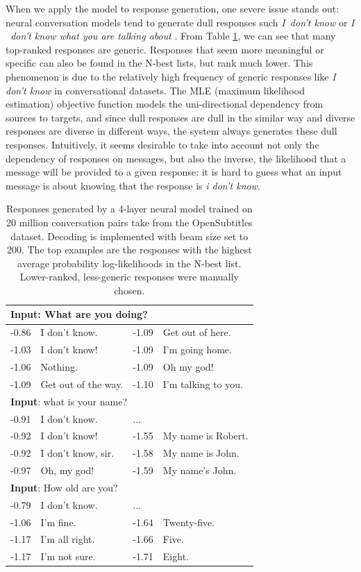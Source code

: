 When we apply the \sts model to response generation, one severe issue stands out:
neural conversation models tend to generate 
dull responses such
 \textit{I~don't know} or  \textit{I ~don't know what you are talking about} \cite{serban2015hierarchical,vinyals2015neural}. 
From Table \ref{sample:mle}, we can see that
many top-ranked responses are generic. %
Responses that seem more meaningful or specific can also be found in the N-best lists, but rank much lower.
This phenomenon is due to the 
 relatively high frequency of generic responses like 
 \textit{I don't know} in conversational datasets.
 The MLE (maximum likelihood estimation) objective function models the uni-directional dependency from sources to targets, 
 and since 
 dull responses are dull in the similar way and diverse responses are diverse in different ways, the system always generates these dull responses. 
 Intuitively, it seems desirable to take into account not only the dependency of responses on messages, but also the inverse, the likelihood that a message will be provided to a given response:
 it is hard to guess what an input message is about knowing that the response is {\it i don't know}.
 
\begin{table}[!ht]
\center
\small
\begin{tabular}{ll}\toprule
\multicolumn{2}{l}{{\bf Input}: What are you doing?}  \\\midrule
-0.86~~I don't know.&-1.09~~Get out of here.\\
-1.03~~I don't know!&-1.09~~I'm going home. \\
-1.06~~Nothing.& -1.09~~Oh my god! \\
-1.09~~Get out of the way.&-1.10~~I'm talking to you.\\\midrule
\multicolumn{2}{l}{{\bf Input}: what is your name?} \\\midrule 
-0.91~~I don't know. & ... \\
-0.92~~I don't know! & -1.55~~My name is Robert.\\
-0.92~~I don't know, sir.&-1.58~~My name is John. \\
-0.97~~Oh, my god!& -1.59~~My name's John. \\\midrule
\multicolumn{2}{l}{{\bf Input}: How old are you?} \\\midrule 
-0.79~~I don't know. & ... \\
-1.06~~I'm fine.& -1.64~~Twenty-five. \\
-1.17~~I'm all right. & -1.66~~Five.\\
-1.17~~I'm not sure. & -1.71~~Eight. \\\bottomrule
\end{tabular}
\caption[Sample responses  from vanilla \sts neural models]{Responses generated by a 4-layer \sts neural model trained on 20 million conversation pairs take from the OpenSubtitles dataset.
Decoding is implemented with beam size set to 200. The top examples are the responses with the highest average probability log-likelihoods in the N-best list. Lower-ranked, less-generic responses were manually chosen.} 
\label{sample:mle}
\end{table}


